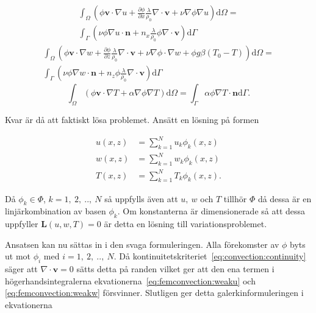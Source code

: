 \begin{align}
\int_\Omega \left(\phi\mathbf{v}\cdot\nabla u +
\frac{\partial \phi}{\partial x}\frac{\lambda}{\rho_0}\nabla\cdot\mathbf{v}
+\nu\nabla\phi\nabla u\right)\mathrm{d}\Omega = \nonumber \\
\int_\Gamma\left( \nu\phi\nabla u\cdot\mathbf{n} +
n_x\frac{\lambda}{\rho_0}\phi\nabla\cdot\mathbf{v}\right)\mathrm{d}\Gamma
\label{eq:femconvection:weaku}
\end{align}
\begin{align}
\int_\Omega\left(\phi\mathbf{v}\cdot\nabla w
+ \frac{\partial \phi}{\partial z} \frac{\lambda}{\rho_0}\nabla\cdot\mathbf{v}
+ \nu\nabla\phi\cdot\nabla w + \phi g\beta(T_0-T)\right)\mathrm{d}\Omega
= \nonumber \\
\int_\Gamma\left(\nu\phi\nabla w\cdot\mathbf{n} +
n_z\phi\frac{\lambda}{\rho_0}\nabla\cdot\mathbf{v}\right)\mathrm{d}\Gamma
\label{eq:femconvection:weakw}
\end{align}
\begin{equation}
\int_\Omega\left(\phi\mathbf{v}\cdot\nabla T + \alpha\nabla\phi\nabla T\right)\mathrm{d}\Omega
= \int_\Gamma \alpha\phi\nabla T\cdot\mathbf{n}\mathrm{d}\Gamma.
\label{eq:femconvection:weakT}
\end{equation}


Kvar är då att faktiskt lösa problemet.
Ansätt en lösning på formen

\begin{align}
u(x,z) &= \sum^N_{k=1}u_k\phi_k(x,z)
\nonumber \\
w(x,z) &= \sum^N_{k=1}w_k\phi_k(x,z)
\nonumber \\
T(x,z) &= \sum^N_{k=1}T_k\phi_k(x,z).
\label{eq:femconvection:ansatz}
\end{align}

Då $\phi_k \in \Phi$, $k=1,~2,~..,~N$ så uppfylls även att $u,~w$ och $T$ tillhör
$\Phi$ då dessa är en linjärkombination av basen $\phi_k$. Om konstanterna
är dimensionerade så att dessa uppfyller $\mathbf{L}(u,w,T) = 0$ är detta
en lösning till variationsproblemet. \cite{johnson2009}\cite{heath2002}\cite{lewis04}

Ansatsen kan nu sättas in i den svaga formuleringen.
Alla förekomster av $\phi$ byts ut mot $\phi_i$ med $i=1,~2,~..,~N$. Då
kontinuitetskriteriet~\eqref{eq:convection:continuity} säger att
$\nabla\cdot\mathbf{v} = 0$ sätts detta på randen vilket ger att den
ena termen i högerhandsintegralerna ekvationerna~\eqref{eq:femconvection:weaku} och
\eqref{eq:femconvection:weakw}
försvinner. Slutligen ger
detta galerkinformuleringen i ekvationerna

